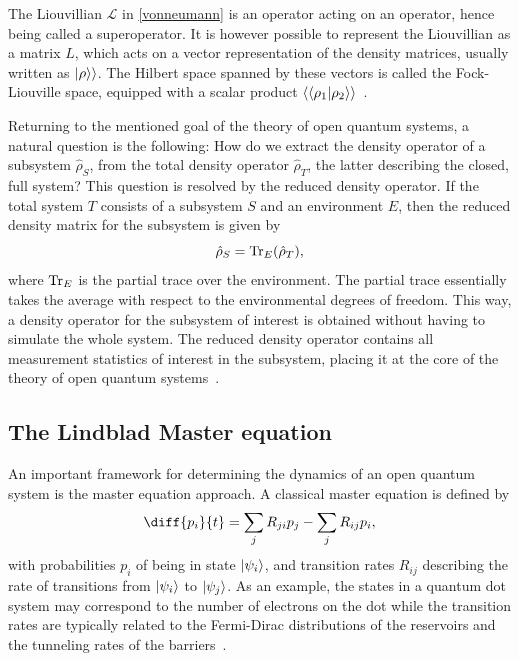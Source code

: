 \documentclass[../main.tex]{subfiles}
\begin{document}
The Liouvillian $\mathcal{L}$ in \cref{vonneumann} is an operator acting on an operator, hence being called a superoperator. It is however possible to represent the Liouvillian as a matrix $L$, which acts on a vector representation of the density matrices, usually written as $\ket{\rho}\rangle$. The Hilbert space spanned by these vectors is called the Fock-Liouville space, equipped with a scalar product $\langle\braket{\rho_1|\rho_2}\rangle$~\cite{lindblad}. 

Returning to the mentioned goal of the theory of open quantum systems, a natural question is the following: How do we extract the density operator of a subsystem $\hat\rho_S$, from the total density operator $\hat\rho_T$, the latter describing the closed, full system? This question is resolved by the reduced density operator. If the total system $T$ consists of a subsystem $S$ and an environment $E$, then the reduced density matrix for the subsystem is given by
\begin{equation}
    \hat\rho_S = \operatorname{Tr}_E({\hat\rho_T}),
\end{equation}
where $\operatorname{Tr}_E$ is the partial trace over the environment. The partial trace essentially takes the average with respect to the environmental degrees of freedom. This way, a density operator for the subsystem of interest is obtained without having to simulate the whole system. The reduced density operator contains all measurement statistics of interest in the subsystem, placing it at the core of the theory of open quantum systems~\cite{bookopen}.

\subsection{The Lindblad Master equation}\label{sec:lind}
An important framework for determining the dynamics of an open quantum system is the master equation approach. A classical master equation is defined by
\begin{equation}\label{master}
    \diff{p_i}{t} = \sum_j R_{ji}p_j  - \sum_j R_{ij}p_i,
\end{equation}
with probabilities $p_i$ of being in state $\ket{\psi_i}$, and transition rates $R_{ij}$ describing the rate of transitions from $\ket{\psi_i}$ to $\ket{\psi_j}$. As an example, the states in a quantum dot system may correspond to the number of electrons on the dot while the transition rates are typically related to the Fermi-Dirac distributions of the reservoirs and the tunneling rates of the barriers~\cite{transport}.
\end{document}
